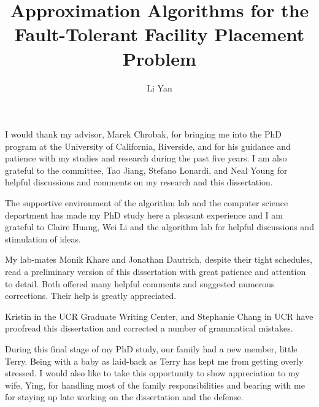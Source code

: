 \documentclass[oneside,final]{ucr}
\begin{document}

\title{Approximation Algorithms for the Fault-Tolerant Facility Placement Problem}
\author{Li Yan}

\maketitle
\copyrightpage{}
\approvalpage{}


\begin{frontmatter}

\begin{acknowledgements}
  I would thank my advisor, Marek Chrobak, for bringing me
  into the PhD program at the University of California,
  Riverside, and for his guidance and patience with my studies
  and research during the past five years. I am also
  grateful to the committee, Tao Jiang, Stefano Lonardi, and
  Neal Young for helpful discussions and comments on my
  research and this dissertation.

  The supportive environment of the algorithm lab and the
  computer science department has made my PhD study here a
  pleasant experience and I am grateful to Claire Huang, Wei
  Li and the algorithm lab for helpful discussions and
  stimulation of ideas.

  My lab-mates Monik Khare and Jonathan Dautrich, despite their tight
  schedules, read a preliminary version of this dissertation
  with great patience and attention to detail. Both offered
  many helpful comments and suggested numerous
  corrections. Their help is greatly appreciated.

  Kristin in the UCR Graduate Writing Center, and Stephanie
  Chang in UCR have proofread this dissertation and
  corrected a number of grammatical mistakes.

  During this final stage of my PhD study, our family had a
  new member, little Terry. Being with a baby as laid-back
  as Terry has kept me from getting overly stressed. I would
  also like to take this opportunity to show appreciation to
  my wife, Ying, for handling most of the family
  responsibilities and bearing with me for staying up late
  working on the dissertation and the defense.
\end{acknowledgements}


\end{frontmatter}
\end{document}
